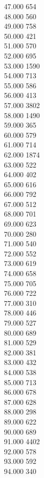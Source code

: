 { 47.000	654 \\
 48.000	560 \\
 49.000	758 \\
 50.000	421 \\
 51.000	570 \\
 52.000	695 \\
 53.000	1590 \\
 54.000	713 \\
 55.000	586 \\
 56.000	413 \\
 57.000	3802 \\
 58.000	1490 \\
 59.000	365 \\
 60.000	579 \\
 61.000	714 \\
 62.000	1874 \\
 63.000	522 \\
 64.000	402 \\
 65.000	616 \\
 66.000	792 \\
 67.000	512 \\
 68.000	701 \\
 69.000	623 \\
 70.000	280 \\
 71.000	540 \\
 72.000	552 \\
 73.000	619 \\
 74.000	658 \\
 75.000	705 \\
 76.000	722 \\
 77.000	310 \\
 78.000	446 \\
 79.000	527 \\
 80.000	689 \\
 81.000	529 \\
 82.000	381 \\
 83.000	432 \\
 84.000	538 \\
 85.000	713 \\
 86.000	678 \\
 87.000	628 \\
 88.000	298 \\
 89.000	622 \\
 90.000	689 \\
 91.000	4402 \\
 92.000	578 \\
 93.000	592 \\
 94.000	340 \\
}
